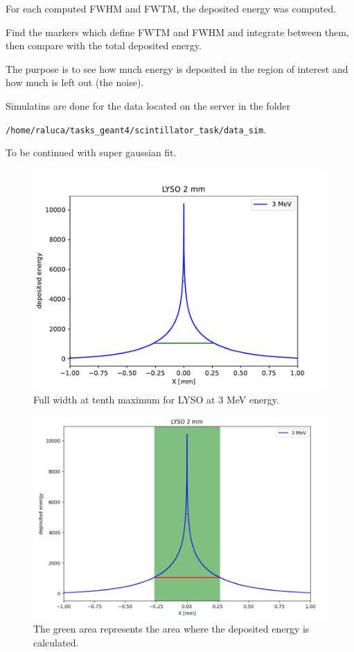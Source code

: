 \documentclass{article}
\begin{document}
For each computed FWHM and FWTM, the deposited energy was computed. 

Find the markers which define FWTM and FWHM and integrate between them, then compare with the total deposited energy.

The purpose is to see how much energy is deposited in the region of interest and how much is left out (the noise).

Simulatins are done for the data located on the server in the folder

 \verb|/home/raluca/tasks_geant4/scintillator_task/data_sim|.

To be continued with super gaussian fit.


\begin{figure}[H]
    \centering
    \includegraphics[width=0.7\linewidth]{images/task5/LYSO_3MeV.pdf}
    \caption{Full width at tenth maximum for LYSO at 3 MeV energy.}
\end{figure}
\begin{figure}[H]
    \centering
    \includegraphics[width=0.7\linewidth]{images/task5/lyso_fwtm.jpg}
    \caption{The green area represents the area where the deposited energy is calculated.}
\end{figure}
\end{document}
